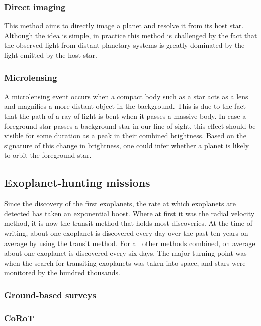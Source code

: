 \subsubsection{Direct imaging}
This method aims to directly image a planet and resolve it from its host star. Although the idea is simple, in practice this method is challenged by the fact that the observed light from distant planetary systems is greatly dominated by the light emitted by the host star.

\subsubsection{Microlensing}
A microlensing event occurs when a compact body such as a star acts as a lens and magnifies a more distant object in the background. This is due to the fact that the path of a ray of light is bent when it passes a massive body. In case a foreground star passes a background star in our line of sight, this effect should be visible for some duration as a peak in their combined brightness. Based on the signature of this change in brightness, one could infer whether a planet is likely to orbit the foreground star.

\subsection{Exoplanet-hunting missions}
Since the discovery of the first exoplanets, the rate at which exoplanets are detected has taken an exponential boost. Where at first it was the radial velocity method, it is now the transit method that holds most discoveries.  At the time of writing, about one exoplanet is discovered every day over the past ten years on average by using the transit method. For all other methods combined, on average about one exoplanet is discovered every six days. The major turning point was when the search for transiting exoplanets was taken into space, and stars were monitored by the hundred thousands.

\subsubsection{Ground-based surveys}


\subsubsection{CoRoT}


